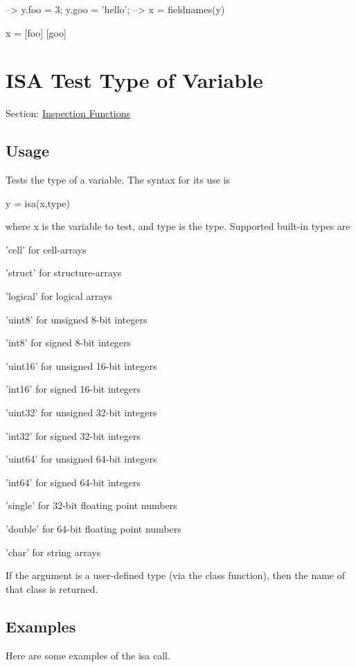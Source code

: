 \begin{DoxyVerbInclude}
--> y.foo = 3; y.goo = 'hello';
--> x = fieldnames(y)

x = 
 [foo] 
 [goo] 
\end{DoxyVerbInclude}
 \hypertarget{inspection_isa}{}\section{I\-S\-A Test Type of Variable}\label{inspection_isa}
Section\-: \hyperlink{sec_inspection}{Inspection Functions} \hypertarget{vtkwidgets_vtkxyplotwidget_Usage}{}\subsection{Usage}\label{vtkwidgets_vtkxyplotwidget_Usage}
Tests the type of a variable. The syntax for its use is \begin{DoxyVerb}   y = isa(x,type)
\end{DoxyVerb}
 where {\ttfamily x} is the variable to test, and {\ttfamily type} is the type. Supported built-\/in types are 
\begin{DoxyItemize}
\item {\ttfamily 'cell'} for cell-\/arrays  
\item {\ttfamily 'struct'} for structure-\/arrays  
\item {\ttfamily 'logical'} for logical arrays  
\item {\ttfamily 'uint8'} for unsigned 8-\/bit integers  
\item {\ttfamily 'int8'} for signed 8-\/bit integers  
\item {\ttfamily 'uint16'} for unsigned 16-\/bit integers  
\item {\ttfamily 'int16'} for signed 16-\/bit integers  
\item {\ttfamily 'uint32'} for unsigned 32-\/bit integers  
\item {\ttfamily 'int32'} for signed 32-\/bit integers  
\item {\ttfamily 'uint64'} for unsigned 64-\/bit integers  
\item {\ttfamily 'int64'} for signed 64-\/bit integers  
\item {\ttfamily 'single'} for 32-\/bit floating point numbers  
\item {\ttfamily 'double'} for 64-\/bit floating point numbers  
\item {\ttfamily 'char'} for string arrays  
\end{DoxyItemize}If the argument is a user-\/defined type (via the {\ttfamily class} function), then the name of that class is returned. \hypertarget{variables_matrix_Examples}{}\subsection{Examples}\label{variables_matrix_Examples}
Here are some examples of the {\ttfamily isa} call.


